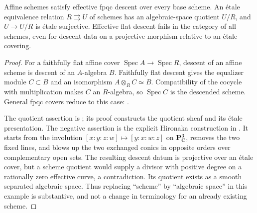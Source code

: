 \begin{theorem}\label{thm:B3-descent}
Affine schemes satisfy effective fpqc descent over every base scheme.
An \'etale equivalence relation $R\rightrightarrows U$ of schemes
has an algebraic-space quotient $U/R$, and $U\to U/R$ is \'etale
surjective. Effective flat descent fails in the category of all
schemes, even for descent data on a projective morphism relative to
an \'etale covering.
\end{theorem}
\begin{proof}
For a faithfully flat affine cover $\operatorname{Spec}A\to
\operatorname{Spec}R$, descent of an affine scheme is descent of an
$A$-algebra $B$. Faithfully flat descent gives the equalizer module
$C\subset B$ and an isomorphism $A\otimes_R C\simeq B$.
Compatibility of the cocycle with multiplication makes $C$ an
$R$-algebra, so $\operatorname{Spec}C$ is the descended scheme.
General fpqc covers reduce to this case:
\cite[Lemma 35.37.1, tag 0245]{BStacks}.

The quotient assertion is
\cite[Theorem 65.10.5, tag 02WW]{BStacks}; its proof constructs the
quotient sheaf and its \'etale presentation. The negative assertion
is the explicit Hironaka construction in
\cite[Lemma 110.68.1, tag 08KE]{BStacks}. It starts from the
involution $[x:y:z:w]\mapsto[y:x:w:z]$ on $\mathbf P^3_{\mathbb{C}}$, removes
the two fixed lines, and blows up the two exchanged conics in
opposite orders over complementary open sets. The resulting
descent datum is projective over an \'etale cover, but a scheme
quotient would supply a divisor with positive degree on a
rationally zero effective curve, a contradiction. Its quotient
exists as a smooth separated algebraic space. Thus replacing
``scheme'' by ``algebraic space'' in this example is substantive,
and not a change in terminology for an already existing scheme.
\end{proof}

